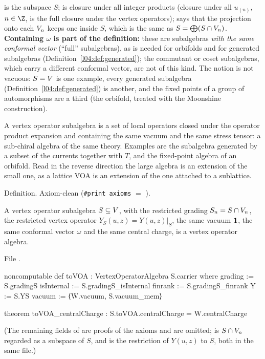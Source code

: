 \begin{dictionary}
 is the subspace $S$;  is closure under all integer products
(closure under all $u_{(n)}$, $n\in\Z$, is the full closure under the vertex operators);  says that the projection onto each
$V_n$ keeps one inside $S$, which is the same as $S = \bigoplus(S\cap V_n)$. \textbf{Containing $\omega$ is part of
the definition:} these are subalgebras \emph{with the same conformal vector} (``full'' subalgebras), as is needed for
orbifolds and for generated subalgebras (Definition~\ref{l04:def:generated}); the commutant or coset subalgebras, which
carry a different conformal vector, are not of this kind. The notion is not vacuous: $S=V$ is one example, every generated subalgebra
(Definition~\ref{l04:def:generated}) is another, and the fixed points of a group of automorphisms are a third (the
orbifold, treated with the Moonshine construction).
\end{dictionary}

\begin{physics}
A vertex operator subalgebra is a set of local operators closed under the operator product expansion and
containing the same vacuum and the same stress tensor: a sub-chiral algebra of the same theory. Examples are the
subalgebra generated by a subset of the currents together with $T$, and the fixed-point algebra of an orbifold. Read
in the reverse direction the large algebra is an extension of the small one, as a lattice VOA is an extension of the one
attached to a sublattice.
\end{physics}

\begin{status}
Definition. Axiom-clean (\texttt{\#print axioms}  $=$
\lean{[propext, Classical.}\allowbreak{}\allowbreak\lean{sound]}).
\end{status}

\begin{theorem}\label{l04:thm:subalg}
A vertex operator subalgebra $S\subseteq V$, with the restricted grading $S_n = S\cap V_n$, the restricted vertex
operator $Y_S(u,z) = Y(u,z)|_S$, the same vacuum $\mathbf{1}$, the same conformal vector $\omega$ and the same central
charge, is a vertex operator algebra.
\end{theorem}
\noindent File .
\begin{leancode}
noncomputable def toVOA : VertexOperatorAlgebra S.carrier where
  grading := S.gradingS
  isInternal := S.gradingS_isInternal
  finrank := S.gradingS_finrank
  Y := S.YS
  vacuum := ⟨W.vacuum, S.vacuum_mem⟩

theorem toVOA_centralCharge : S.toVOA.centralCharge = W.centralCharge
\end{leancode}
(The remaining fields of  are proofs of the axioms and are omitted;  is $S\cap V_n$ regarded
as a subspace of $S$, and  is the restriction of $Y(u,z)$ to $S$, both in the same file.)

